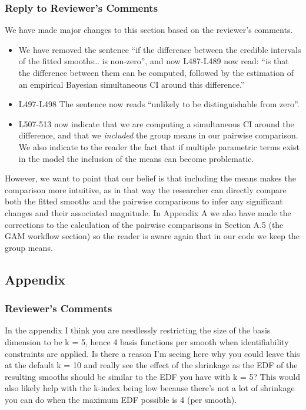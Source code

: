 \documentclass[
]{article}
\begin{document}
\hypertarget{section-9}{%
\subsubsection{\texorpdfstring{\textcolor{reviewersblue} {Reply to Reviewer's Comments}}{}}\label{section-9}}

We have made major changes to this section based on the reviewer's comments.

\begin{itemize}
\item
  We have removed the sentence ``if the difference between the credible intervals of the fitted smooths\ldots{} is non-zero'', and now L487-L489 now read: ``is that the difference between them can be computed, followed by the estimation of an empirical Bayesian simultaneous CI around this difference.''
\item
  L497-L498 The sentence now reads ``unlikely to be distinguishable from zero''.
\item
  L507-513 now indicate that we are computing a simultaneous CI around the difference, and that we \emph{included} the group means in our pairwise comparison. We also indicate to the reader the fact that if multiple parametric terms exist in the model the inclusion of the means can become problematic.
\end{itemize}

However, we want to point that our belief is that including the means makes the comparison more intuitive, as in that way the researcher can directly compare both the fitted smooths and the pairwise comparisons to infer any significant changes and their associated magnitude. In Appendix A we also have made the corrections to the calculation of the pairwise comparisons in Section A.5 (the GAM workflow section) so the reader is aware again that in our code we keep the group means.

\hypertarget{appendix}{%
\subsection{Appendix}\label{appendix}}

\hypertarget{reviewers-comments-9}{%
\subsubsection{Reviewer's Comments}\label{reviewers-comments-9}}

In the appendix I think you are needlessly restricting the size of the basis dimension to be k = 5, hence 4 basis functions per smooth when identifiability constraints are applied. Is there a reason I'm seeing here why you could leave this at the default k = 10 and really see the effect of the shrinkage as the EDF of the resulting smooths should be similar to the EDF you have with k = 5? This would also likely help with the k-index being low because there's not a lot of shrinkage you can do when the maximum EDF possible is 4 (per smooth).
\end{document}
